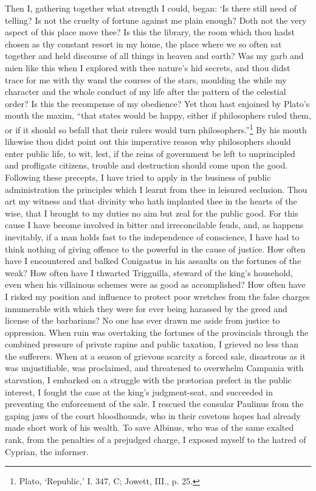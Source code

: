 \documentclass[11pt]{book}
\begin{document}
Then I, gathering together what strength I could, began: `Is there still
need of telling? Is not the cruelty of fortune against me plain enough?
Doth not the very aspect of this place move thee? Is this the library,
the room which thou hadst chosen as thy constant resort in my home, the
place where we so often sat together and held discourse of all things in
heaven and earth? Was my garb and mien like this when I explored with
thee nature's hid secrets, and thou didst trace for me with thy wand
the courses of the stars, moulding the while my character and the whole
conduct of my life after the pattern of the celestial order? Is this the
recompense of my obedience? Yet thou hast enjoined by Plato's mouth the
maxim, ``that states would be happy, either if philosophers ruled them,
or if it should so befall that their rulers would turn philosophers.''\footnote{Plato, ‘Republic,’ I. 347, C; Jowett, III., p. 25.} By
his mouth likewise thou didst point out this imperative reason why
philosophers should enter public life, to wit, lest, if the reins of
government be left to unprincipled and profligate citizens, trouble and
destruction should come upon the good. Following these precepts, I have
tried to apply in the business of public administration the principles
which I learnt from thee in leisured seclusion. Thou art my witness and
that divinity who hath implanted thee in the hearts of the wise, that I
brought to my duties no aim but zeal for the public good. For this cause
I have become involved in bitter and irreconcilable feuds, and, as
happens inevitably, if a man holds fast to the independence of
conscience, I have had to think nothing of giving offence to the
powerful in the cause of justice. How often have I encountered and
balked Conigastus in his assaults on the fortunes of the weak? How often
have I thwarted Trigguilla, steward of the king's household, even when
his villainous schemes were as good as accomplished? How often have I
risked my position and influence to protect poor wretches from the false
charges innumerable with which they were for ever being harassed by the
greed and license of the barbarians? No one has ever drawn me aside from
justice to oppression. When ruin was overtaking the fortunes of the
provincials through the combined pressure of private rapine and public
taxation, I grieved no less than the sufferers. When at a season of
grievous scarcity a forced sale, disastrous as it was unjustifiable, was
proclaimed, and threatened to overwhelm Campania with starvation, I
embarked on a struggle with the prætorian prefect in the public
interest, I fought the case at the king's judgment-seat, and succeeded
in preventing the enforcement of the sale. I rescued the consular
Paulinus from the gaping jaws of the court bloodhounds, who in their
covetous hopes had already made short work of his wealth. To save
Albinus, who was of the same exalted rank, from the penalties of a
prejudged charge, I exposed myself to the hatred of Cyprian, the
informer.
\end{document}
